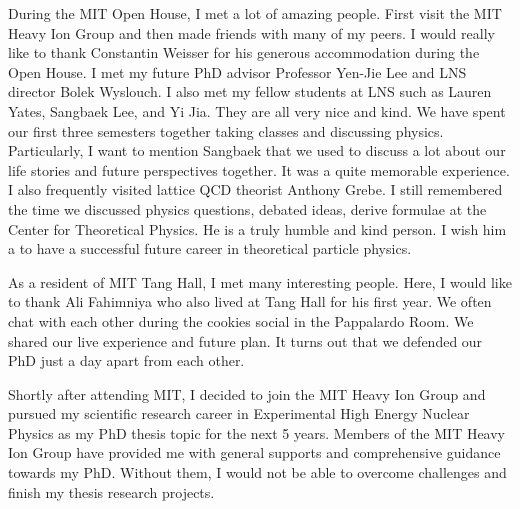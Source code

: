 During the MIT Open House, I met a lot of amazing people. First visit the MIT Heavy Ion Group and then made friends with many of my peers. I would really like to thank Constantin Weisser for his generous accommodation during the Open House. I met my future PhD advisor Professor Yen-Jie Lee and LNS director Bolek Wyslouch. I also met my fellow students at LNS such as Lauren Yates, Sangbaek Lee, and Yi Jia. They are all very nice and kind. We have spent our first three semesters together taking classes and discussing physics. Particularly, I want to mention Sangbaek that we used to discuss a lot about our life stories and future perspectives together. It was a quite memorable experience. I also frequently visited lattice QCD theorist Anthony Grebe. I still remembered the time we discussed physics questions, debated ideas, derive formulae at the Center for Theoretical Physics. He is a truly humble and kind person. I wish him a to have a successful future career in theoretical particle physics.


As a resident of MIT Tang Hall, I met many interesting people. Here, I would like to thank Ali Fahimniya who also lived at Tang Hall for his first year. We often chat with each other during the cookies social in the Pappalardo Room. We shared our live experience and future plan. It turns out that we defended our PhD just a day apart from each other. 

Shortly after attending MIT, I decided to join the MIT Heavy Ion Group and pursued my scientific research career in Experimental High Energy Nuclear Physics as my PhD thesis topic for the next 5 years. Members of the MIT Heavy Ion Group have provided me with general supports and comprehensive guidance towards my PhD. Without them, I would not be able to overcome challenges and finish my thesis research projects. 


